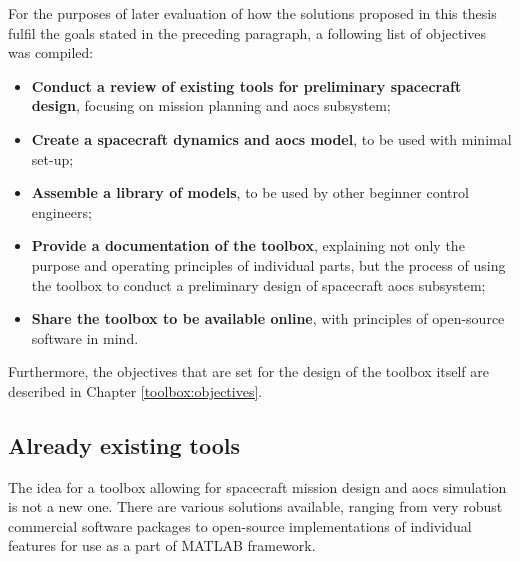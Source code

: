     For the purposes of later evaluation of how the solutions proposed in this thesis fulfil the goals stated in the preceding paragraph, a following list of objectives was compiled:

    \begin{itemize}
        \item \textbf{Conduct a review of existing tools for preliminary spacecraft design}, focusing on mission planning and \ac{aocs} subsystem;
        \item \textbf{Create a spacecraft dynamics and \ac{aocs} model}, to be used with minimal set-up;
        \item \textbf{Assemble a library of models}, to be used by other beginner control engineers;
        \item \textbf{Provide a documentation of the toolbox}, explaining not only the purpose and  operating principles of individual parts, but the process of using the toolbox to conduct a preliminary design of spacecraft \ac{aocs} subsystem;
        \item \textbf{Share the toolbox to be available online}, with principles of open-source software in mind.
    \end{itemize}

    Furthermore, the objectives that are set for the design of the toolbox itself are described in Chapter \ref{toolbox:objectives}.


\subsection{Already existing tools}

    The idea for a toolbox allowing for spacecraft mission design and \ac{aocs} simulation is not a new one. There are various solutions available, ranging from very robust commercial software packages to open-source implementations of individual features for use as a part of MATLAB framework.

